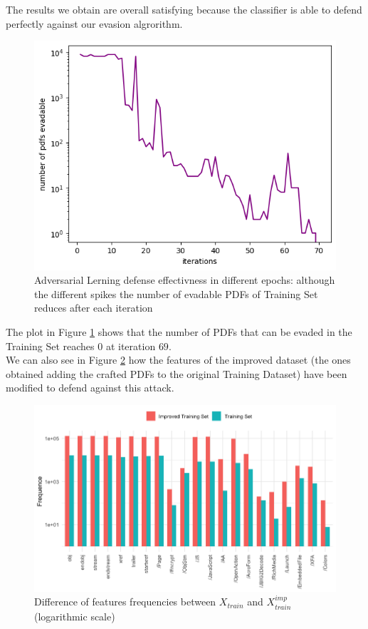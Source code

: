 \documentclass[twocolumn, switch]{article} %
\newcommand\x{0.7}
\begin{document}
The results we obtain are overall satisfying because the classifier is able to defend perfectly against our evasion algrorithm.

\begin{figure}[ht!]
	\centering
	\includegraphics[width=\x\linewidth]{adv_learning.png}
	\caption{Adversarial Lerning defense effectivness in different epochs: although the different spikes the number of evadable PDFs of Training Set reduces after each iteration}
	\label{fig:advlearn}
\end{figure}
The plot in Figure \ref{fig:advlearn} shows that the number of PDFs that can be evaded in the Training Set reaches $0$ at iteration $69$.\\
We can also see in Figure \ref{fig:improved} how the features of the improved dataset (the ones obtained adding the crafted PDFs to the original Training Dataset) have been modified to defend against this attack.

\begin{figure}[ht!]
	\centering
	\includegraphics[width=\x\linewidth]{hist_train_improved.png}
	\caption{Difference of features frequencies between $X_{train}$ and $X_{train}^{imp}$ (logarithmic scale)}
	\label{fig:improved}
\end{figure}
\end{document}
